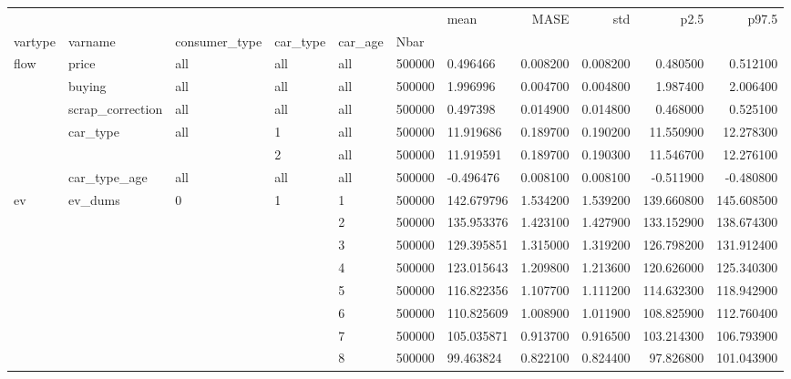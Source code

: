 \begin{tabular}{lllllllrrrr}
\toprule
 &  &  &  &  &  & mean & MASE & std & p2.5 & p97.5 \\
vartype & varname & consumer_type & car_type & car_age & Nbar &  &  &  &  &  \\
\midrule
\multirow[t]{6}{*}{flow} & price & all & all & all & 500000 & 0.496466 & 0.008200 & 0.008200 & 0.480500 & 0.512100 \\
\cline{2-11} \cline{3-11} \cline{4-11} \cline{5-11}
 & buying & all & all & all & 500000 & 1.996996 & 0.004700 & 0.004800 & 1.987400 & 2.006400 \\
\cline{2-11} \cline{3-11} \cline{4-11} \cline{5-11}
 & scrap_correction & all & all & all & 500000 & 0.497398 & 0.014900 & 0.014800 & 0.468000 & 0.525100 \\
\cline{2-11} \cline{3-11} \cline{4-11} \cline{5-11}
 & \multirow[t]{2}{*}{car_type} & \multirow[t]{2}{*}{all} & 1 & all & 500000 & 11.919686 & 0.189700 & 0.190200 & 11.550900 & 12.278300 \\
\cline{4-11} \cline{5-11}
 &  &  & 2 & all & 500000 & 11.919591 & 0.189700 & 0.190300 & 11.546700 & 12.276100 \\
\cline{2-11} \cline{3-11} \cline{4-11} \cline{5-11}
 & car_type_age & all & all & all & 500000 & -0.496476 & 0.008100 & 0.008100 & -0.511900 & -0.480800 \\
\cline{1-11} \cline{2-11} \cline{3-11} \cline{4-11} \cline{5-11}
\multirow[t]{51}{*}{ev} & \multirow[t]{51}{*}{ev_dums} & \multirow[t]{51}{*}{0} & \multirow[t]{25}{*}{1} & 1 & 500000 & 142.679796 & 1.534200 & 1.539200 & 139.660800 & 145.608500 \\
\cline{5-11}
 &  &  &  & 2 & 500000 & 135.953376 & 1.423100 & 1.427900 & 133.152900 & 138.674300 \\
\cline{5-11}
 &  &  &  & 3 & 500000 & 129.395851 & 1.315000 & 1.319200 & 126.798200 & 131.912400 \\
\cline{5-11}
 &  &  &  & 4 & 500000 & 123.015643 & 1.209800 & 1.213600 & 120.626000 & 125.340300 \\
\cline{5-11}
 &  &  &  & 5 & 500000 & 116.822356 & 1.107700 & 1.111200 & 114.632300 & 118.942900 \\
\cline{5-11}
 &  &  &  & 6 & 500000 & 110.825609 & 1.008900 & 1.011900 & 108.825900 & 112.760400 \\
\cline{5-11}
 &  &  &  & 7 & 500000 & 105.035871 & 0.913700 & 0.916500 & 103.214300 & 106.793900 \\
\cline{5-11}
 &  &  &  & 8 & 500000 & 99.463824 & 0.822100 & 0.824400 & 97.826800 & 101.043900 \\

\end{tabular}
